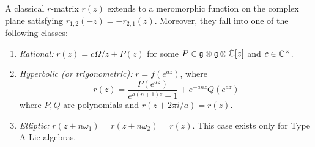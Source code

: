 \begin{theorem}
  A classical $r$-matrix $r(z)$ extends
  to a meromorphic function on the
  complex plane satisfying
  $r_{1, 2}(-z) = -r_{2, 1}(z)$. Moreover,
  they fall into one of the following
  classes:
  \begin{enumerate}
    \item \emph{Rational:}
      $r(z) = c \Omega / z + P(z)$ for
      some $P \in \mathfrak{g} \otimes \mathfrak{g} \otimes \mathbb{C}[z]$
      and $c \in \mathbb{C}^\times$.
    \item \emph{Hyperbolic (or trigonometric):}
      $r = f(e^{az})$, where
      \[
        r(z)
        = \frac{P(e^{az})}{e^{a(n + 1)z} - 1}
        + e^{-anz} Q(e^{az})
      \]
      where $P, Q$ are polynomials
      and $r(z + 2\pi i / a) = r(z)$.
    \item \emph{Elliptic:}
      $r(z + n \omega_1) = r(z + n\omega_2) = r(z)$.
      This case exists only for
      Type A Lie algebras.
  \end{enumerate}
\end{theorem}
